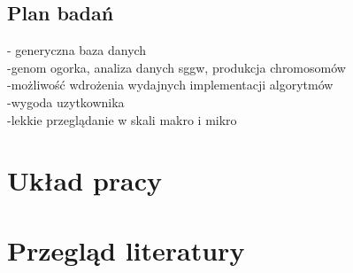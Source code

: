 \subsection{Plan badań}
- generyczna baza danych \\
-genom ogorka, analiza danych sggw, produkcja chromosomów \\
-możliwość wdrożenia wydajnych implementacji algorytmów \\
-wygoda uzytkownika \\
-lekkie przeglądanie w skali makro i mikro \\

\section{Układ pracy}
\label{section:uklad_pracy}

\section{Przegląd literatury}
\label{section:przeglad_literatury}
